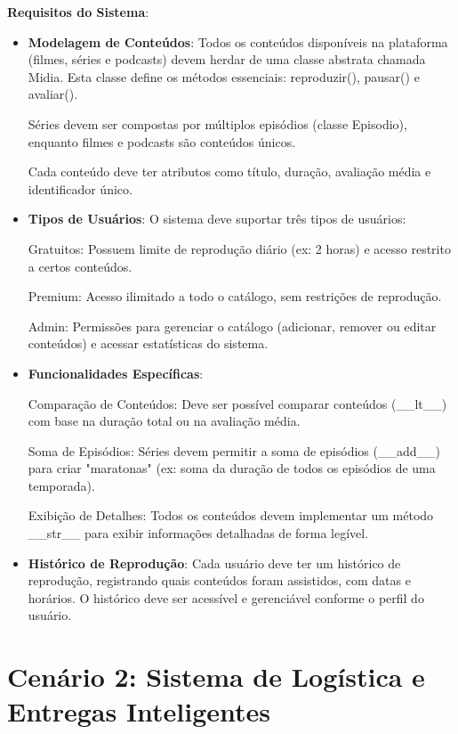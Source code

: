 \textbf{Requisitos do Sistema}:
\begin{itemize}
    

   \item  \textbf{Modelagem de Conteúdos}:
    Todos os conteúdos disponíveis na plataforma (filmes, séries e podcasts) devem herdar de uma classe abstrata chamada Midia. Esta classe define os métodos essenciais: reproduzir(), pausar() e avaliar().

        Séries devem ser compostas por múltiplos episódios (classe Episodio), enquanto filmes e podcasts são conteúdos únicos.

        Cada conteúdo deve ter atributos como título, duração, avaliação média e identificador único.

    \item \textbf{Tipos de Usuários}:
    O sistema deve suportar três tipos de usuários:

        Gratuitos: Possuem limite de reprodução diário (ex: 2 horas) e acesso restrito a certos conteúdos.

        Premium: Acesso ilimitado a todo o catálogo, sem restrições de reprodução.

        Admin: Permissões para gerenciar o catálogo (adicionar, remover ou editar conteúdos) e acessar estatísticas do sistema.

    \item \textbf{Funcionalidades Específicas}:

        Comparação de Conteúdos: Deve ser possível comparar conteúdos (\_\_lt\_\_) com base na duração total ou na avaliação média.

        Soma de Episódios: Séries devem permitir a soma de episódios (\_\_add\_\_) para criar "maratonas" (ex: soma da duração de todos os episódios de uma temporada).

        Exibição de Detalhes: Todos os conteúdos devem implementar um método \_\_str\_\_ para exibir informações detalhadas de forma legível.

    \item \textbf{Histórico de Reprodução}:
    Cada usuário deve ter um histórico de reprodução, registrando quais conteúdos foram assistidos, com datas e horários. O histórico deve ser acessível e gerenciável conforme o perfil do usuário.
\end{itemize}



\section{Cenário 2: Sistema de Logística e Entregas Inteligentes}

